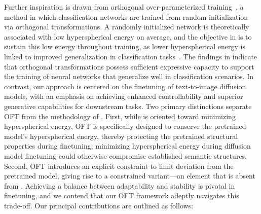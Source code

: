 Further inspiration is drawn from orthogonal over-parameterized training~\cite{liu2021orthogonal}, a method in which classification networks are trained from random initialization via orthogonal transformations. A randomly initialized network is theoretically associated with low hyperspherical energy on average, and the objective in \cite{liu2021orthogonal} is to sustain this low energy throughout training, as lower hyperspherical energy is linked to improved generalization in classification tasks~\cite{liu2018learning,lin2020regularizing}. The findings in \cite{liu2021orthogonal} indicate that orthogonal transformations possess sufficient expressive capacity to support the training of neural networks that generalize well in classification scenarios. In contrast, our approach is centered on the finetuning of text-to-image diffusion models, with an emphasis on achieving enhanced controllability and superior generative capabilities for downstream tasks. Two primary distinctions separate OFT from the methodology of \cite{liu2021orthogonal}. First, while \cite{liu2021orthogonal} is oriented toward minimizing hyperspherical energy, OFT is specifically designed to conserve the pretrained model’s hyperspherical energy, thereby protecting the pretrained structural properties during finetuning; minimizing hyperspherical energy during diffusion model finetuning could otherwise compromise established semantic structures. Second, OFT introduces an explicit constraint to limit deviation from the pretrained model, giving rise to a constrained variant—an element that is absent from \cite{liu2021orthogonal}. Achieving a balance between adaptability and stability is pivotal in finetuning, and we contend that our OFT framework adeptly navigates this trade-off. Our principal contributions are outlined as follows:

